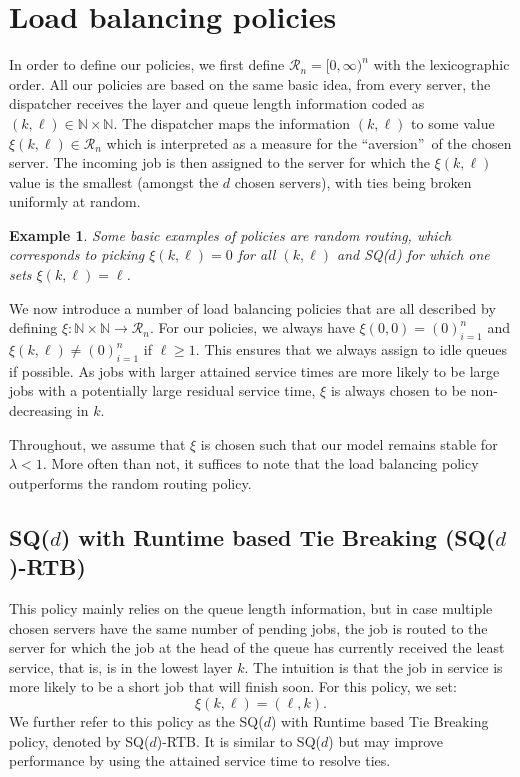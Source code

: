 \documentclass[12pt]{report}
\newtheorem{vbd}[theorem]{Example}
\begin{document}
\section{Load balancing policies} \label{sec:examples}
In order to define our policies, we first define $\mathcal{R}_n=[0,\infty)^n$ with the lexicographic order. All our policies are based on the same basic idea, from every server, the dispatcher receives the layer and queue length information coded as $(k, \ell) \in \mathbb{N} \times \mathbb{N}$. The dispatcher maps the information $(k,\ell)$ to some value $\xi(k, \ell) \in \mathcal{R}_n$ which is interpreted as a measure for the \textquotedblleft aversion\textquotedblright\ of the chosen server. The incoming job is then assigned to the server for which the $\xi(k,\ell)$ 
value is the smallest (amongst the $d$ chosen servers), with ties being broken uniformly at random.
\begin{vbd}
Some basic examples of policies are random routing, which corresponds to picking $\xi(k,\ell)=0$ for all $(k,\ell)$ and SQ($d$) for which one sets $\xi(k,\ell) = \ell$.
\end{vbd}
We now introduce a number of load balancing policies that are all described by defining $\xi:\mathbb{N} \times \mathbb{N} \rightarrow \mathcal{R}_n$. For our policies, we always have $\xi(0,0)=(0)_{i=1}^n$ and $\xi(k,\ell) \neq (0)_{i=1}^n$ if $\ell \geq 1$. This ensures that we always assign to idle queues if possible. As jobs with larger attained service times are more
likely to be large jobs with a potentially large residual service time, $\xi$ is always chosen to be non-decreasing in $k$.

Throughout, we assume that $\xi$ is chosen such that our model remains stable for $\lambda < 1$. More often than not, it suffices to note that the load balancing policy outperforms the random routing policy.

\subsection{SQ($d$) with Runtime based Tie Breaking (SQ($d$)-RTB)}\label{sec:RTB}
This policy mainly relies on the queue length information, but in case multiple chosen servers have the same number of pending jobs, the job is routed to the server for which the job at the head of the queue has currently received the least service, that is, is in the lowest layer $k$. The intuition is that the job in service is more likely to be a short job that will finish soon.
For this policy, we set:
\begin{equation} \label{eq:xi_SQ_RTB}
\xi(k, \ell) = (\ell, k).
\end{equation}
We further refer to this policy as the SQ($d$) with Runtime based Tie Breaking policy, denoted by SQ($d$)-RTB. It is similar to SQ($d$) but may improve performance by using the attained service time to resolve ties.
\end{document}
